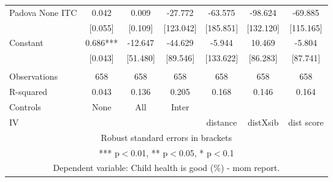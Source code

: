 \begin{tabular}{lcccccc}
Padova None ITC & 0.042 & 0.009 & -27.772 & -63.575 & -98.624 & -69.885 \\
 & [0.055] & [0.109] & [123.042] & [185.851] & [132.120] & [115.165] \\
Constant & 0.686*** & -12.647 & -44.629 & -5.944 & 10.469 & -5.804 \\
 & [0.043] & [51.480] & [89.546] & [133.622] & [86.283] & [87.741] \\
 &  &  &  &  &  &  \\
Observations & 658 & 658 & 658 & 658 & 658 & 658 \\
R-squared & 0.043 & 0.136 & 0.205 & 0.168 & 0.146 & 0.164 \\
Controls & None & All & Inter &  &  &  \\
 IV &  &  &  & distance & distXsib & dist score \\ \hline
\multicolumn{7}{c}{ Robust standard errors in brackets} \\
\multicolumn{7}{c}{ *** p$<$0.01, ** p$<$0.05, * p$<$0.1} \\
\multicolumn{7}{c}{ Dependent variable: Child health is good (\%) - mom report.} \\
\end{tabular}
